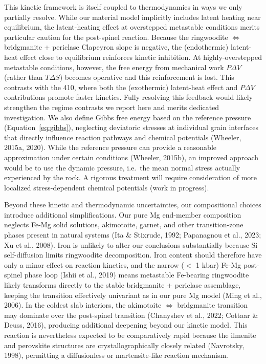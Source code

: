 \documentclass[draft,linenumbers]{agujournal2019}
\begin{document}
This kinetic framework is itself coupled to thermodynamics in ways we
only partially resolve. While our material model implicitly includes
latent heating near equilibrium, the latent-heating effect at
overstepped metastable conditions merits particular caution for the
post-spinel reaction. Because the ringwoodite \(\Leftrightarrow\)
bridgmanite + periclase Clapeyron slope is negative, the (endothermic)
latent-heat effect close to equilibrium reinforces kinetic inhibition.
At highly-overstepped metastable conditions, however, the free energy
from mechanical work \(P\Delta V\) (rather than \(T\Delta S\)) becomes
operative and this reinforcement is lost. This contrasts with the 410,
where both the (exothermic) latent-heat effect and \(P\Delta V\)
contributions promote faster kinetics. Fully resolving this feedback
would likely strengthen the regime contrasts we report here and merits
dedicated investigation. We also define Gibbs free energy based on the
reference pressure (Equation~\ref{eq:gibbs}), neglecting deviatoric
stresses at individual grain interfaces that directly influence reaction
pathways and chemical potentials (Wheeler, 2015a, 2020). While the
reference pressure can provide a reasonable approximation under certain
conditions (Wheeler, 2015b), an improved approach would be to use the
dynamic pressure, i.e.~the mean normal stress actually experienced by
the rock. A rigorous treatment will require consideration of more
localized stress-dependent chemical potentials (work in progress).

Beyond these kinetic and thermodynamic uncertainties, our compositional
choices introduce additional simplifications. Our pure Mg end-member
composition neglects Fe-Mg solid solutions, akimotoite, garnet, and
other transition-zone phases present in natural systems (Ita \&
Stixrude, 1992; Papanagnou et al., 2023; Xu et al., 2008). Iron is
unlikely to alter our conclusions substantially because Si
self-diffusion limits ringwoodite decomposition. Iron content should
therefore have only a minor effect on reaction kinetics, and the narrow
(\(<\) 1 kbar) Fe-Mg post-spinel phase loop ({Ishii et al.}, 2019) means
metastable Fe-bearing ringwoodite likely transforms directly to the
stable bridgmanite + periclase assemblage, keeping the transition
effectively univariant as in our pure Mg model (Ming et al., 2006). In
the coldest slab interiors, the akimotoite \(\Leftrightarrow\)
bridgmanite transition may dominate over the post-spinel transition
({Chanyshev et al.}, 2022; Cottaar \& Deuss, 2016), producing additional
deepening beyond our kinetic model. This reaction is nevertheless
expected to be comparatively rapid because the ilmenite and perovskite
structures are crystallographically closely related (Navrotsky, 1998),
permitting a diffusionless or martensite-like reaction mechanism.
\end{document}
